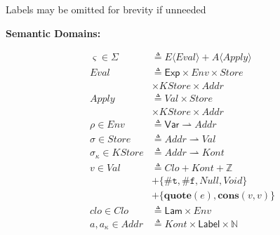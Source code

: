 \documentclass[12pt,draft]{article}
\newcommand{\truesyn}{\texttt{\#t}}
\newcommand{\falsesyn}{\texttt{\#f}}
\begin{document}
{\begin{multicols*}{2}
\vfill\null
{\scriptsize *Labels may be omitted for brevity if unneeded}
\columnbreak


\begin{center}
\textbf{Semantic Domains:}
\end{center}
\vspace{-8mm}
\begin{align*}
\varsigma \in \Sigma &\triangleq E\langle\textit{Eval}\rangle
								+ A\langle\textit{Apply}\rangle \\
  \textit{Eval} &\triangleq
                  \textsf{Exp} \times \textit{Env} \times \textit{Store} \\
                     & \times \textit{KStore} \times \textit{Addr} \\
  \textit{Apply} &\triangleq
                   \textit{Val} \times \textit{Store} \\
                     & \times \textit{KStore} \times \textit{Addr} \\
  \rho \in \textit{Env} &\triangleq \textsf{Var} \rightharpoonup
	  											\textit{Addr} \\
  \sigma \in \textit{Store} &\triangleq \textit{Addr} \rightharpoonup
                              \textit{Val} \\
  \sigma_\kappa \in \textit{KStore} &\triangleq \textit{Addr} \rightharpoonup
                              \textit{Kont} \\
  v \in \textit{Val} &\triangleq \textit{Clo} + \textit{Kont} + \mathbb{Z} \\
                     &+ \{ \truesyn,\falsesyn, \textit{Null} , \textit{Void} \} \\
                     &+ \{\textbf{quote}(e) , \textbf{cons}(v, v)\} \\
  clo \in \textit{Clo} &\triangleq \textsf{Lam} \times \textit{Env} \\
  a, a_\kappa \in \textit{Addr} &\triangleq \textit{Kont} \times \textsf{Label} \times \mathbb{N} \\

\end{align*}
\end{multicols*}}
\end{document}
